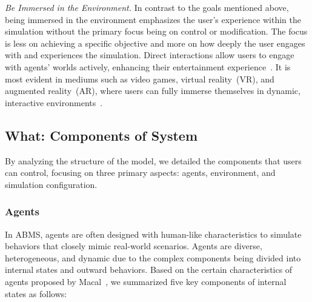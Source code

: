 \textit{Be Immersed in the Environment.}
In contrast to the goals mentioned above, being immersed in the environment emphasizes the user's experience within the simulation without the primary focus being on control or modification.
The focus is less on achieving a specific objective and more on how deeply the user engages with and experiences the simulation.
Direct interactions allow users to engage with agents' worlds actively, enhancing their entertainment experience~\cite{10.1145/3586183.3606763}.
It is most evident in mediums such as video games, virtual reality~(VR), and augmented reality~(AR), where users can fully immerse themselves in dynamic, interactive environments~\cite{mao2024alympicsllmagentsmeet}.


\subsection{What: Components of System}\label{what}
By analyzing the structure of the model, we detailed the components that users can control, focusing on three primary aspects: agents, environment, and simulation configuration.
\subsubsection{Agents} In ABMS, agents are often designed with human-like characteristics to simulate behaviors that closely mimic real-world scenarios. 
Agents are diverse, heterogeneous, and dynamic due to the complex components being divided into internal states and outward behaviors.
Based on the certain characteristics of agents proposed by Macal\etal~\cite{1574234}, we summarized five key components of internal states as follows:

